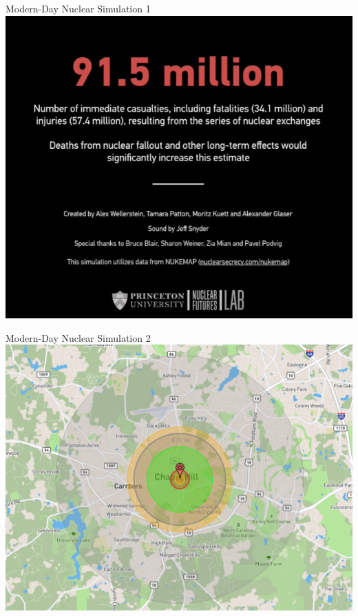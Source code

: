 \documentclass[handout]{beamer}
\begin{document}
\begin{frame}{\LARGE Modern-Day Nuclear Simulation 1}
    \centering
\includegraphics[width=\textwidth,height=0.9\textheight,keepaspectratio]{nuclear simulation.JPG}
\end{frame}

\begin{frame}{\LARGE Modern-Day Nuclear Simulation 2}
	\centering
	\includegraphics[width=\textwidth,height=0.9\textheight,keepaspectratio]{UNCnuke.png}
\end{frame}
\end{document}

